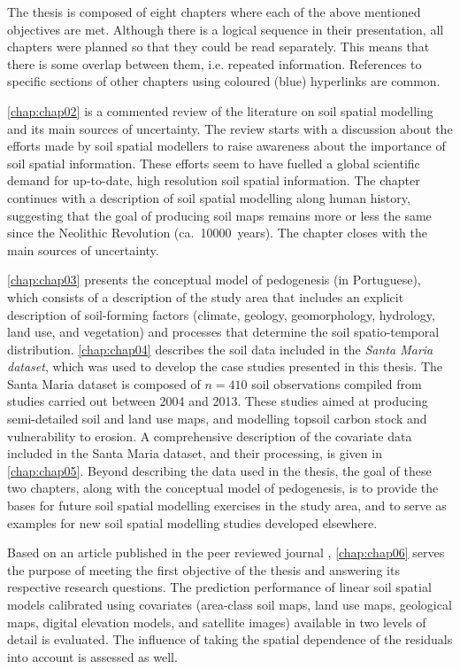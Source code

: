 The thesis is composed of eight chapters where each of the above mentioned objectives are met. Although there 
is a logical sequence in their presentation, all chapters were planned so that they could be read separately. 
This means that there is some overlap between them, i.e. repeated information. References to specific sections 
of other chapters using coloured (blue) hyperlinks are common.

\autoref{chap:chap02} is a commented review of the literature on soil spatial modelling and its main sources 
of uncertainty. The review starts with a discussion about the efforts made by soil spatial modellers to 
raise awareness about the importance of soil spatial information. These efforts seem to have fuelled a global 
scientific demand for up-to-date, high resolution soil spatial information. The chapter continues with a 
description of soil spatial modelling along human history, suggesting that the goal of producing soil maps 
remains more or less the same since the Neolithic Revolution (ca.~\num{10000}~years). The chapter closes with 
the main sources of uncertainty.

\autoref{chap:chap03} presents the conceptual model of pedogenesis (in Portuguese), which consists of a 
description of the study area that includes an explicit description of soil-forming factors (climate, geology, 
geomorphology, hydrology, land use, and vegetation) and processes that determine the soil spatio-temporal 
distribution. \autoref{chap:chap04} describes the soil data included in the \emph{Santa Maria dataset}, which 
was used to develop the case studies presented in this thesis. The Santa Maria dataset is composed of 
$n = 410$ soil observations compiled from studies carried out between \num{2004} and \num{2013}. These studies 
aimed at producing semi-detailed soil and land use maps, and modelling topsoil carbon stock and vulnerability 
to erosion. A comprehensive description of the covariate data included in the Santa Maria dataset, and their 
processing, is given in \autoref{chap:chap05}. Beyond describing the data used in the thesis, the goal of these 
two 
chapters, along with the conceptual model of pedogenesis, is to provide the bases for future soil spatial 
modelling 
exercises in the study area, and to serve as examples for new soil spatial modelling studies developed 
elsewhere.

Based on an article published in the peer reviewed journal \geoderma, \autoref{chap:chap06} serves the purpose 
of meeting the first objective of the thesis and answering its respective research questions. The 
prediction performance of linear soil spatial models calibrated using covariates (area-class soil maps, land 
use maps, geological maps, digital elevation models, and satellite images) available in two levels of detail 
is 
evaluated. The influence of taking the spatial dependence of the residuals into account is assessed as well. 

